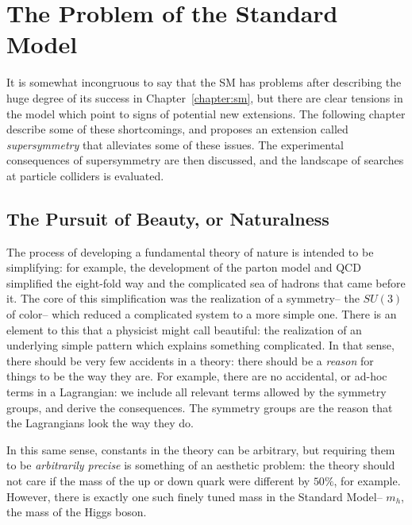 \label{chapter:susy}

\section{The Problem of the Standard Model}
\label{chapter:susy:problems}

It is somewhat incongruous to say that the SM has problems after describing the huge degree of its success in Chapter~\ref{chapter:sm}, but there are clear tensions in the model which point to signs of potential new extensions. The following chapter describe some of these shortcomings, and proposes an extension called \textit{supersymmetry} that alleviates some of these issues. The experimental consequences of supersymmetry are then discussed, and the landscape of searches at particle colliders is evaluated.

\subsection{The Pursuit of Beauty, or Naturalness}
\label{chapter:susy:problems:naturalness}
The process of developing a fundamental theory of nature is intended to be simplifying: for example, the development of the parton model and QCD simplified the eight-fold way and the complicated sea of hadrons  that came before it. The core of this simplification was the realization of a symmetry-- the $SU(3)$ of color-- which reduced a complicated system to a more simple one. There is an element to this that a physicist might call beautiful: the realization of an underlying simple pattern which explains something complicated. In that sense, there should be very few accidents in a theory: there should be a \textit{reason} for things to be the way they are. For example, there are no accidental, or ad-hoc terms in a Lagrangian: we include all relevant terms allowed by the symmetry groups, and derive the consequences. The symmetry groups are the reason that the Lagrangians look the way they do.

In this same sense, constants in the theory can be arbitrary, but requiring them to be \textit{arbitrarily precise} is something of an aesthetic problem: the theory should not care if the mass of the up or down quark were different by $50\%$, for example. However, there is exactly one such finely tuned mass in the Standard Model-- $m_h$, the mass of the Higgs boson. 

